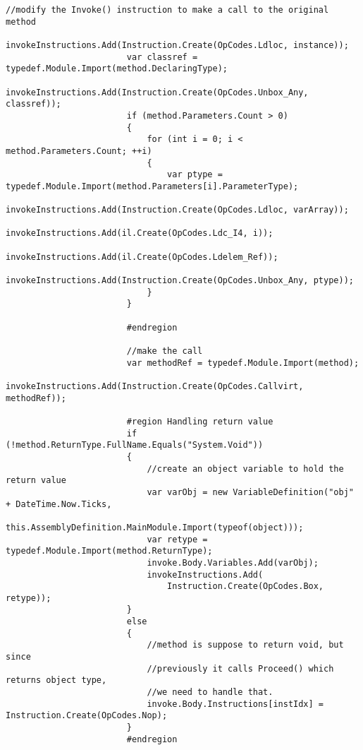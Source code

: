 \begin{lstlisting}[caption={../buffalo/Injectors/MethodAroundInjector.cs}, label=../buffalo/Injectors/MethodAroundInjector.cs, frame=tb, basicstyle=\scriptsize]
                        //modify the Invoke() instruction to make a call to the original method
                        invokeInstructions.Add(Instruction.Create(OpCodes.Ldloc, instance));
                        var classref = typedef.Module.Import(method.DeclaringType);
                        invokeInstructions.Add(Instruction.Create(OpCodes.Unbox_Any, classref));
                        if (method.Parameters.Count > 0)
                        {
                            for (int i = 0; i < method.Parameters.Count; ++i)
                            {
                                var ptype = typedef.Module.Import(method.Parameters[i].ParameterType);
                                invokeInstructions.Add(Instruction.Create(OpCodes.Ldloc, varArray));
                                invokeInstructions.Add(il.Create(OpCodes.Ldc_I4, i));
                                invokeInstructions.Add(il.Create(OpCodes.Ldelem_Ref));
                                invokeInstructions.Add(Instruction.Create(OpCodes.Unbox_Any, ptype));
                            }
                        }

                        #endregion

                        //make the call
                        var methodRef = typedef.Module.Import(method);
                        invokeInstructions.Add(Instruction.Create(OpCodes.Callvirt, methodRef));

                        #region Handling return value
                        if (!method.ReturnType.FullName.Equals("System.Void"))
                        {
                            //create an object variable to hold the return value
                            var varObj = new VariableDefinition("obj" + DateTime.Now.Ticks,
                                this.AssemblyDefinition.MainModule.Import(typeof(object)));
                            var retype = typedef.Module.Import(method.ReturnType);
                            invoke.Body.Variables.Add(varObj);
                            invokeInstructions.Add(
                                Instruction.Create(OpCodes.Box, retype));
                        }
                        else
                        {
                            //method is suppose to return void, but since
                            //previously it calls Proceed() which returns object type,
                            //we need to handle that.
                            invoke.Body.Instructions[instIdx] = Instruction.Create(OpCodes.Nop);
                        }
                        #endregion


\end{lstlisting}
